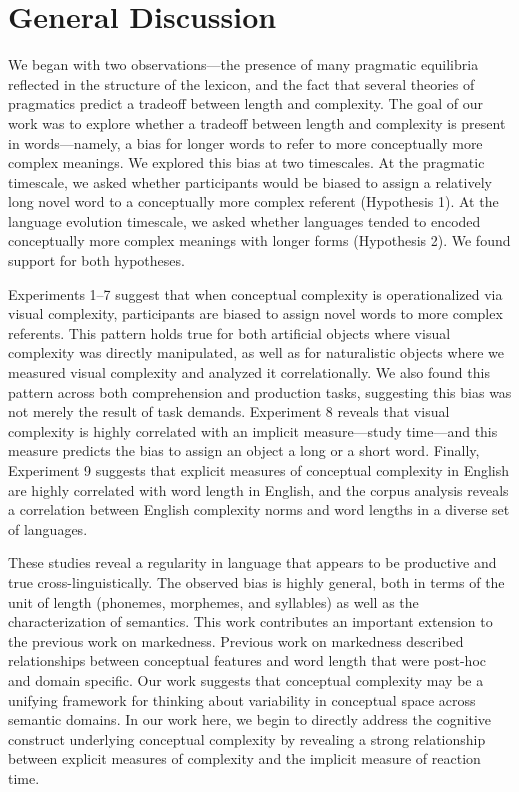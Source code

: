 \documentclass[man]{apa2}
\begin{document}
\section{General Discussion}

We began with two observations---the presence of many pragmatic equilibria reflected in the structure of the lexicon, and the fact that several theories of pragmatics predict a tradeoff between length and complexity. The goal of our work was to explore whether a tradeoff between length and complexity is present in words---namely, a bias for longer words to refer to more conceptually more complex meanings. We explored this bias at two timescales. At the pragmatic timescale, we asked whether participants would be biased to assign a relatively long novel word to a conceptually more complex referent (Hypothesis 1). At the language evolution timescale, we asked whether languages tended to encoded conceptually more complex meanings with longer forms (Hypothesis 2). We found support for both hypotheses.

Experiments 1--7 suggest that when conceptual complexity is operationalized via visual complexity, participants are biased to assign novel words to more complex referents. This pattern holds true for both artificial objects where visual complexity was directly manipulated, as well as for naturalistic objects where we measured visual complexity and analyzed it correlationally. We also found this pattern across both comprehension and production tasks, suggesting this bias was not merely the result of task demands. Experiment 8 reveals that visual complexity is highly correlated with an implicit measure---study time---and this measure predicts the bias to assign an object a long or a short word. Finally, Experiment 9 suggests that explicit measures of conceptual complexity in English are highly correlated with word length in English, and the corpus analysis reveals a correlation between English complexity norms and word lengths in a diverse set of languages.

These studies reveal a regularity in language that appears to be productive and true cross-linguistically. The observed bias is highly general, both in terms of the unit of length (phonemes, morphemes, and syllables) as well as the characterization of semantics. This work contributes an important extension to the previous work on markedness. Previous work on markedness described relationships between conceptual features and word length that were post-hoc and domain specific. Our work suggests that conceptual complexity may be a unifying framework for thinking about variability in conceptual space across semantic domains. In our work here, we begin to directly address the cognitive construct underlying conceptual complexity by revealing a strong relationship between explicit measures of complexity and the implicit measure of reaction time.
\end{document}
